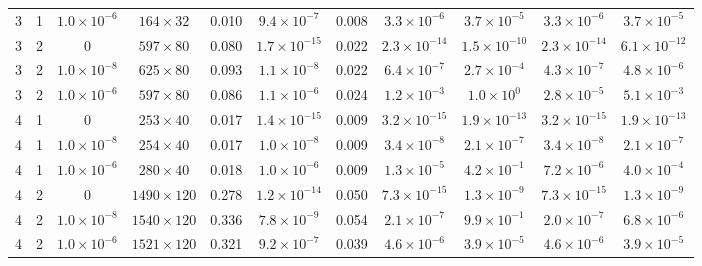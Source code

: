 \begin{tabular}{ccc|ccc|ccc|cc}
3 & 1 & $1.0\times 10^{-6}$ & $164\times 32$ & 0.010 & $9.4\times 10^{-7}$ & 0.008 & $3.3\times 10^{-6}$ & $3.7\times 10^{-5}$ & $3.3\times 10^{-6}$ & $3.7\times 10^{-5}$\\
3 & 2 & $0$ & $597\times 80$ & 0.080 & $1.7\times 10^{-15}$ & 0.022 & $2.3\times 10^{-14}$ & $1.5\times 10^{-10}$ & $2.3\times 10^{-14}$ & $6.1\times 10^{-12}$\\
3 & 2 & $1.0\times 10^{-8}$ & $625\times 80$ & 0.093 & $1.1\times 10^{-8}$ & 0.022 & $6.4\times 10^{-7}$ & $2.7\times 10^{-4}$ & $4.3\times 10^{-7}$ & $4.8\times 10^{-6}$\\
3 & 2 & $1.0\times 10^{-6}$ & $597\times 80$ & 0.086 & $1.1\times 10^{-6}$ & 0.024 & $1.2\times 10^{-3}$ & $1.0\times 10^{0}$ & $2.8\times 10^{-5}$ & $5.1\times 10^{-3}$\\
4 & 1 & $0$ & $253\times 40$ & 0.017 & $1.4\times 10^{-15}$ & 0.009 & $3.2\times 10^{-15}$ & $1.9\times 10^{-13}$ & $3.2\times 10^{-15}$ & $1.9\times 10^{-13}$\\
4 & 1 & $1.0\times 10^{-8}$ & $254\times 40$ & 0.017 & $1.0\times 10^{-8}$ & 0.009 & $3.4\times 10^{-8}$ & $2.1\times 10^{-7}$ & $3.4\times 10^{-8}$ & $2.1\times 10^{-7}$\\
4 & 1 & $1.0\times 10^{-6}$ & $280\times 40$ & 0.018 & $1.0\times 10^{-6}$ & 0.009 & $1.3\times 10^{-5}$ & $4.2\times 10^{-1}$ & $7.2\times 10^{-6}$ & $4.0\times 10^{-4}$\\
4 & 2 & $0$ & $1490\times 120$ & 0.278 & $1.2\times 10^{-14}$ & 0.050 & $7.3\times 10^{-15}$ & $1.3\times 10^{-9}$ & $7.3\times 10^{-15}$ & $1.3\times 10^{-9}$\\
4 & 2 & $1.0\times 10^{-8}$ & $1540\times 120$ & 0.336 & $7.8\times 10^{-9}$ & 0.054 & $2.1\times 10^{-7}$ & $9.9\times 10^{-1}$ & $2.0\times 10^{-7}$ & $6.8\times 10^{-6}$\\
4 & 2 & $1.0\times 10^{-6}$ & $1521\times 120$ & 0.321 & $9.2\times 10^{-7}$ & 0.039 & $4.6\times 10^{-6}$ & $3.9\times 10^{-5}$ & $4.6\times 10^{-6}$ & $3.9\times 10^{-5}$\\
\hline
\end{tabular}\\[2pt]
